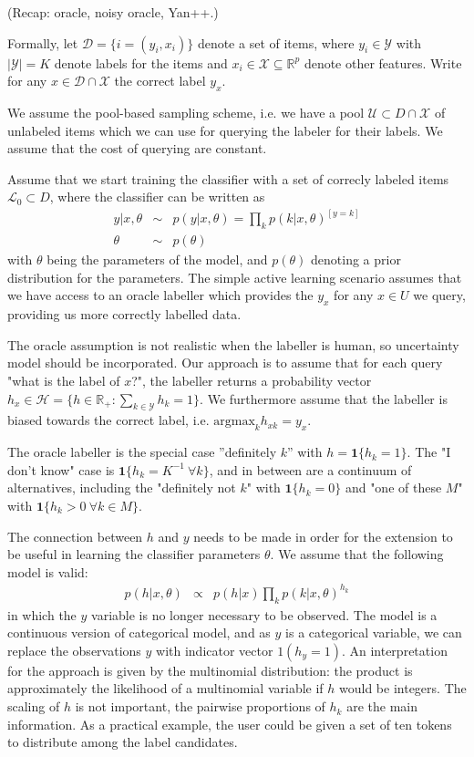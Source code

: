 \documentclass[10pt, onecolumn]{article}
\newcommand{\U}{\mathcal{U}}
\renewcommand{\L}{\mathcal{L}}
\newcommand{\answer}{h}
\renewcommand{\H}{\mathcal{H}}
\newcommand{\R}{\mathbb{R}}
\newcommand{\X}{\mathcal{X}}
\newcommand{\D}{\mathcal{D}}
\newcommand{\C}{\mathcal{Y}}
\begin{document}
(Recap: oracle, noisy oracle, Yan++.)

Formally, let $\D=\{i=(y_i,x_i)\}$ denote a set of items, where $y_i\in \C$ with $|\C|=K$ denote labels for the items and $x_i\in \X\subseteq \R^p$ denote other features. Write for any $x\in\D\cap \X$ the correct label $y_x$. 

We assume the pool-based sampling scheme, i.e. we have a pool $\U\subset D\cap \X$ of unlabeled items which we can use for querying the labeler for their labels. We assume that the cost of querying are constant.

Assume that we start training the classifier with a set of correcly labeled items $\L_0\subset D$, where the classifier can be written as
\begin{eqnarray}
y | x, \theta &\sim & p(y| x, \theta)=\prod_k p(k|x,\theta)^{[y=k]}\\
\theta & \sim & p(\theta)
\end{eqnarray}
with $\theta$ being the parameters of the model, and $p(\theta)$ denoting a prior distribution for the parameters. The simple active learning scenario assumes that we have access to an oracle labeller which provides the $y_x$ for any $x\in U$ we query, providing us more correctly labelled data. 

The oracle assumption is not realistic when the labeller is human, so uncertainty model should be incorporated. Our approach is to assume that for each query "what is the label of $x$?", the labeller returns a probability vector $\answer_x \in \H=\{h\in \R_+: \sum_{k\in \C} h_k=1\}$. We furthermore assume that the labeller is biased towards the correct label, i.e. $\mathrm{argmax}_k h_{xk}=y_x$.

The oracle labeller is the special case ''definitely $k$'' with $h=\mathbf{1}\{h_k=1\}$. The "I don't know" case is $\mathbf{1}\{ h_k=K^{-1}\ \forall k\}$, and in between are a continuum of alternatives, including the "definitely not $k$" with $\mathbf{1}\{h_k=0\}$ and "one of these $M$" with $\mathbf{1}\{h_k>0\ \forall k\in M\}$.

The connection between $h$ and $y$ needs to be made in order for the extension to be useful in learning the classifier parameters $\theta$. We assume that the following model is valid:
\begin{eqnarray}
\label{eq:ph}
p(h|x, \theta)&\propto&p(h|x) \prod_k p(k|x, \theta)^{h_k}
\end{eqnarray}
in which the $y$ variable is no longer necessary to be observed. The model is a continuous version of  categorical model, and as $y$ is a categorical variable, we can replace the observations $y$ with indicator vector $1(h_y=1)$. An interpretation for the approach is given by the multinomial distribution: the product is approximately the likelihood of a multinomial variable if $h$ would be integers. The scaling of $h$ is not important, the pairwise proportions of $h_k$ are the main information. As a practical example, the user could be given a set of ten tokens to distribute among the label candidates.
\end{document}
